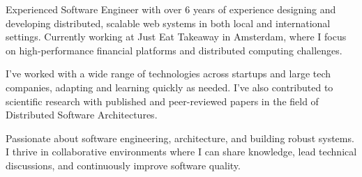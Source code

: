 
\begin{cvparagraph}

Experienced Software Engineer with over 6 years of experience designing and developing distributed, scalable web systems in both local and international settings. Currently working at Just Eat Takeaway in Amsterdam, where I focus on high-performance financial platforms and distributed computing challenges.

I’ve worked with a wide range of technologies across startups and large tech companies, adapting and learning quickly as needed. I’ve also contributed to scientific research with published and peer-reviewed papers in the field of Distributed Software Architectures.

Passionate about software engineering, architecture, and building robust systems. I thrive in collaborative environments where I can share knowledge, lead technical discussions, and continuously improve software quality.
\end{cvparagraph}
